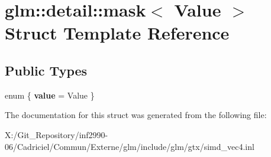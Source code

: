 \hypertarget{structglm_1_1detail_1_1mask}{\section{glm\-:\-:detail\-:\-:mask$<$ Value $>$ Struct Template Reference}
\label{structglm_1_1detail_1_1mask}
}
\subsection*{Public Types}
\begin{DoxyCompactItemize}
\item 
enum \{ {\bfseries value} = Value
 \}
\end{DoxyCompactItemize}


The documentation for this struct was generated from the following file\-:\begin{DoxyCompactItemize}
\item 
X\-:/\-Git\-\_\-\-Repository/inf2990-\/06/\-Cadriciel/\-Commun/\-Externe/glm/include/glm/gtx/simd\-\_\-vec4.\-inl\end{DoxyCompactItemize}
